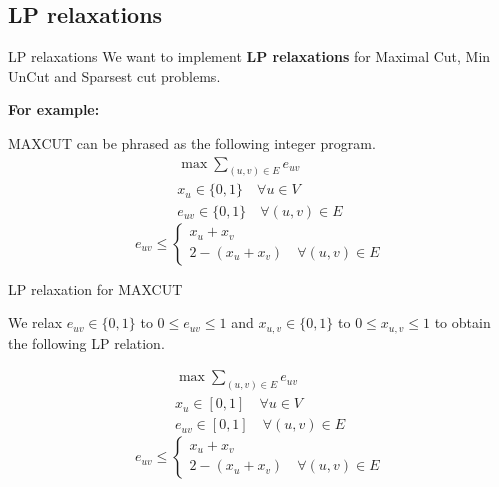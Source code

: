 \documentclass[10pt]{beamer}
\begin{document}
	\subsection{LP relaxations}
        \begin{frame}{LP relaxations}
            We want to implement \textbf{LP relaxations} for Maximal Cut, Min UnCut and Sparsest cut problems.
            
            \textbf{For example:} 
            
            MAXCUT can be phrased as the following integer program.
            \begin{align*}
                \max \sum\limits_{(u,v) \in E} e_{uv} \\
                x_u \in \{0,1\} \quad \forall u \in V\\
                e_{uv} \in \{0,1\} \quad \forall (u,v) \in E
            \end{align*}
            \begin{equation*}
                e_{uv} \le 
                \begin{cases}
                    x_u + x_v \\
                    2 - (x_u + x_v) \quad \forall (u,v) \in E
                \end{cases}
            \end{equation*}
            
        \end{frame}  
        
        \begin{frame}{LP relaxation for MAXCUT}
        
        We relax $e_{uv} \in \{0, 1\}$ to $0 \le e_{uv} \le 1$ and $x_{u,v} \in \{0, 1\}$ to $0 \le x_{u,v} \le 1$ to obtain the following LP relation.
            
            \begin{align*}
                \max \sum\limits_{(u,v) \in E} e_{uv} \\
                x_u \in [0,1] \quad \forall u \in V\\
                e_{uv} \in [0,1] \quad \forall (u,v) \in E
            \end{align*}
            \begin{equation*}
                e_{uv} \le 
                \begin{cases}
                    x_u + x_v \\
                    2 - (x_u + x_v) \quad \forall (u,v) \in E
                \end{cases}
            \end{equation*}
            
        \end{frame}   
        
\end{document}
